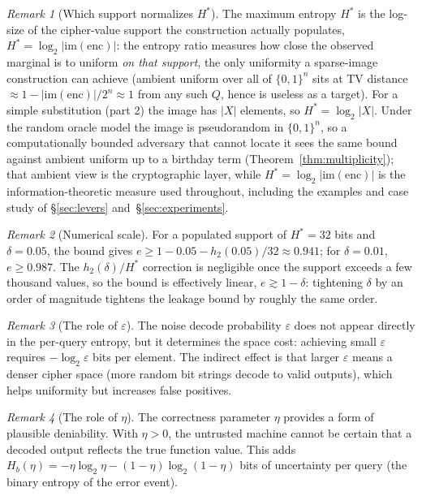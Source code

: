\documentclass[11pt]{article}
\theoremstyle{definition}
\theoremstyle{plain}
\theoremstyle{remark}
\newtheorem{remark}{Remark}[section]
\newcommand{\enc}{\mathrm{enc}}
\newcommand{\B}{\{0,1\}}
\begin{document}
\begin{remark}[Which support normalizes $H^*$]
\label{rem:hstar}
The maximum entropy $H^*$ is the log-size of the cipher-value support the
construction actually populates, $H^* = \log_2|\mathrm{im}(\enc)|$: the
entropy ratio measures how close the observed marginal is to uniform
\emph{on that support}, the only uniformity a sparse-image construction
can achieve (ambient uniform over all of $\B^n$ sits at TV distance
$\approx 1 - |\mathrm{im}(\enc)|/2^n \approx 1$ from any such $Q$, hence
is useless as a target).  For a simple substitution (part 2) the image
has $|X|$ elements, so $H^* = \log_2|X|$.  Under the random oracle model
the image is pseudorandom in $\B^n$, so a computationally bounded
adversary that cannot locate it sees the same bound against ambient
uniform up to a birthday term (Theorem~\ref{thm:multiplicity}); that
ambient view is the cryptographic layer, while
$H^* = \log_2|\mathrm{im}(\enc)|$ is the information-theoretic measure
used throughout, including the examples and case study of
\S\ref{sec:levers} and~\S\ref{sec:experiments}.
\end{remark}

\begin{remark}[Numerical scale]
For a populated support of $H^* = 32$ bits and $\delta = 0.05$, the bound
gives $e \geq 1 - 0.05 - h_2(0.05)/32 \approx 0.941$; for $\delta = 0.01$,
$e \geq 0.987$.  The $h_2(\delta)/H^*$ correction is negligible once the
support exceeds a few thousand values, so the bound is effectively
linear, $e \gtrsim 1 - \delta$: tightening $\delta$ by an order of
magnitude tightens the leakage bound by roughly the same order.
\end{remark}

\begin{remark}[The role of $\varepsilon$]
The noise decode probability $\varepsilon$ does not appear directly in
the per-query entropy, but it determines the space cost: achieving small
$\varepsilon$ requires $-\log_2 \varepsilon$ bits per element.  The
indirect effect is that larger $\varepsilon$ means a denser cipher space
(more random bit strings decode to valid outputs), which helps uniformity
but increases false positives.
\end{remark}

\begin{remark}[The role of $\eta$]
The correctness parameter $\eta$ provides a form of plausible
deniability.  With $\eta > 0$, the untrusted machine cannot be certain
that a decoded output reflects the true function value.  This adds
$H_b(\eta) = -\eta \log_2 \eta - (1-\eta) \log_2(1-\eta)$ bits of
uncertainty per query (the binary entropy of the error event).
\end{remark}
\end{document}
